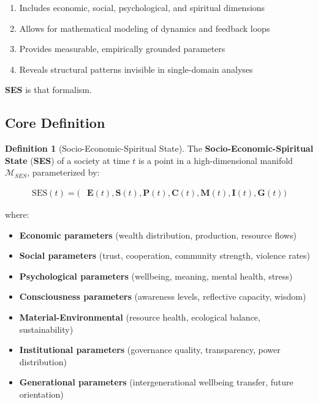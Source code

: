 \documentclass[11pt,a4paper]{article}
\newcommand{\SES}{\textbf{SES}}
\theoremstyle{definition}
\newtheorem{definition}{Definition}[section]
\theoremstyle{remark}
\begin{document}
\begin{enumerate}
    \item Includes economic, social, psychological, and spiritual dimensions
    \item Allows for mathematical modeling of dynamics and feedback loops  
    \item Provides measurable, empirically grounded parameters
    \item Reveals structural patterns invisible in single-domain analyses
\end{enumerate}

\SES{} is that formalism.

\subsection{Core Definition}

\begin{definition}[Socio-Economic-Spiritual State]\label{def:ses}
The \textbf{Socio-Economic-Spiritual State} (\SES) of a society at time $t$ is a point in a high-dimensional manifold $\mathcal{M}_{SES}$, parameterized by:

\begin{align}
\text{SES}(t) = \Big( &\mathbf{E}(t), \mathbf{S}(t), \mathbf{P}(t), \mathbf{C}(t), \mathbf{M}(t), \mathbf{I}(t), \mathbf{G}(t) \Big)
\end{align}

where:
\begin{itemize}[leftmargin=2cm]
    \item[$\mathbf{E}$:] \textbf{Economic parameters} (wealth distribution, production, resource flows)
    \item[$\mathbf{S}$:] \textbf{Social parameters} (trust, cooperation, community strength, violence rates)
    \item[$\mathbf{P}$:] \textbf{Psychological parameters} (wellbeing, meaning, mental health, stress)
    \item[$\mathbf{C}$:] \textbf{Consciousness parameters} (awareness levels, reflective capacity, wisdom)
    \item[$\mathbf{M}$:] \textbf{Material-Environmental} (resource health, ecological balance, sustainability)
    \item[$\mathbf{I}$:] \textbf{Institutional parameters} (governance quality, transparency, power distribution)
    \item[$\mathbf{G}$:] \textbf{Generational parameters} (intergenerational wellbeing transfer, future orientation)
\end{itemize}
\end{definition}
\end{document}
